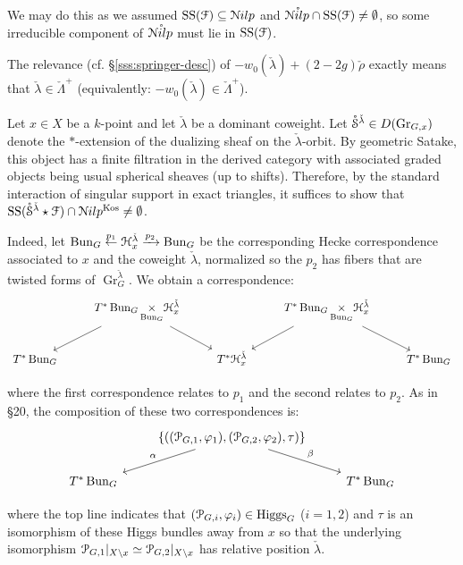 \documentclass[reqno,11pt]{amsart}
\numberwithin{equation}{subsection}
\theoremstyle{remark}
\newcommand{\xar}[1]{\xrightarrow{#1}}
\newcommand{\sF}{{\EuScript F}}
\newcommand{\sH}{{\EuScript H}}
\newcommand{\sN}{{\EuScript N}}
\newcommand{\sP}{{\EuScript P}}
\newcommand{\sS}{{\EuScript S}}
\newcommand{\on}{\operatorname}
\newcommand{\vph}{\varphi}
\newcommand{\Gr}{\on{Gr}}
\newcommand{\Bun}{\on{Bun}}
\renewcommand{\o}[1]{\mathring{#1}}
\renewcommand{\subset}{\subseteq}
\newcommand{\Nilp}{\sN ilp}
\newcommand{\Higgs}{\on{Higgs}}
\newcommand{\Kos}{\on{Kos}}
\renewcommand{\SS}{\on{SS}}
\begin{document}
\noindent We may do this as we assumed $\SS(\sF) \subset \Nilp$ and 
$\o{\Nilp} \cap \SS(\sF) \neq \emptyset$,
so some irreducible component of $\o{\Nilp}$ must lie in $\SS(\sF)$.

The relevance (cf. \S \ref{sss:springer-desc}) of 
$-w_0(\check{\lambda})+(2-2g)\check{\rho}$ exactly means that
$\check{\lambda} \in \check{\Lambda}^+$ (equivalently:
$-w_0(\check{\lambda}) \in \check{\Lambda}^+$).

Let $x \in X$ be a $k$-point and let $\check{\lambda}$ be a dominant coweight.
Let $\o{\sS}^{\check{\lambda}} \in D(\Gr_{G,x})$ denote the $*$-extension 
of the dualizing sheaf on the $\check{\lambda}$-orbit. By geometric Satake,
this object has a finite filtration in the derived category with associated
graded objects being usual spherical sheaves (up to shifts). 
Therefore, by the standard interaction of singular support
in exact triangles, it suffices to show that 
$\SS(\o{\sS}^{\check{\lambda}} \star \sF) \cap \Nilp^{\Kos} \neq \emptyset$.

Indeed, let $\Bun_G \overset{p_1}{\leftarrow} \sH_x^{\check{\lambda}} 
\xar{p_2} \Bun_G$
be the corresponding Hecke correspondence associated to $x$ and the
coweight $\check{\lambda}$, normalized so the $p_2$ has fibers 
that are twisted forms of $\Gr_G^{\check{\lambda}}$.
We obtain a correspondence:
%
\[
\begin{tikzcd}
&
T^*\Bun_G \underset{\Bun_G}{\times} \sH_x^{\check{\lambda}}
\arrow[dl]
\arrow[dr]
&&
T^*\Bun_G \underset{\Bun_G}{\times} \sH_x^{\check{\lambda}}
\arrow[dl]
\arrow[dr]
\\
T^*\Bun_G 
&&
T^*\sH_x^{\check{\lambda}}
&&
T^*\Bun_G
\end{tikzcd}
\]

\noindent where the first correspondence relates to $p_1$ and the
second relates to $p_2$.
As in \cite{agkrrv1} \S 20, 
the composition of these two correspondences is:
%
\[
\begin{tikzcd}
&
\{((\sP_{G,1},\vph_1),(\sP_{G,2},\vph_2),\tau)\}
\arrow[dl,"\alpha",swap]
\arrow[dr,"\beta"]
\\
T^*\Bun_G
&&
T^*\Bun_G
\end{tikzcd}
\]

\noindent where the top line indicates
that $(\sP_{G,i},\vph_i) \in \Higgs_G$ ($i=1,2$) 
and $\tau$ is an isomorphism of these Higgs bundles 
away from $x$ so that the underlying isomorphism
$\sP_{G,1}|_{X\setminus x}\simeq \sP_{G,2}|_{X\setminus x}$
has relative position $\check{\lambda}$.
\end{document}
